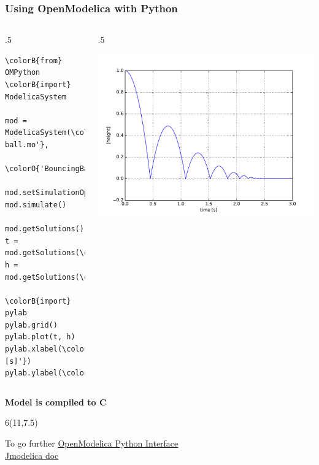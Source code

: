 \begin{frame}[fragile]
  \frametitle{Using OpenModelica with Python}
  \begin{columns}
    \begin{column}{.5\textwidth}
      \fontsize{8.5pt}{8.5pt}\selectfont
\begin{Verbatim}[commandchars=\\\{\}]
\colorB{from} OMPython \colorB{import} ModelicaSystem

mod = ModelicaSystem(\colorO{'bouncing-ball.mo'},
                     \colorO{'BouncingBall'})

mod.setSimulationOptions(stopTime=3)
mod.simulate()

mod.getSolutions()
t = mod.getSolutions(\colorO{'time'})
h = mod.getSolutions(\colorO{'h'})

\colorB{import} pylab
pylab.grid()
pylab.plot(t, h)
pylab.xlabel(\colorO{'time [s]'})
pylab.ylabel(\colorO{'[height]'})
\end{Verbatim}
      \normalsize
    \end{column}
    \begin{column}{.5\textwidth}
      \begin{center}
        \includegraphics[width=1.\textwidth]{figures/bouncing-ball-height.pdf}
      \end{center}
    \end{column}
  \end{columns}
  \vspace{.5em}
  \centerline{\textbf{Model is compiled to C}}
  \vspace{1em}
  \begin{textblock}{6}(11,7.5)
    {\tiny%
      \begin{tabbing}
        To go further \=%
        \href{https://www.openmodelica.org/doc/OpenModelicaUsersGuide/latest/ompython.html}{OpenModelica Python Interface} \\
        \> \href{http://www.jmodelica.org/api-docs/usersguide/2.0/index.html}{Jmodelica doc}
      \end{tabbing}}
  \end{textblock}
\end{frame}

